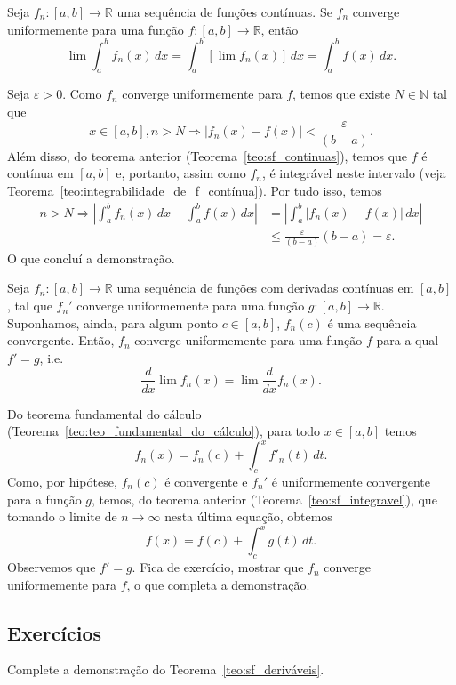 \begin{teo}\label{teo:sf_integravel}
  Seja $f_n:[a, b]\to\mathbb{R}$ uma sequência de funções contínuas. Se $f_n$ converge uniformemente para uma função $f:[a, b]\to\mathbb{R}$, então
  \begin{equation}
    \lim \int_a^b f_n(x)\,dx = \int_a^b [\lim f_n(x)]\,dx = \int_a^b f(x)\,dx.
  \end{equation}
\end{teo}
\begin{dem}
  Seja $\varepsilon>0$. Como $f_n$ converge uniformemente para $f$, temos que existe $N\in\mathbb{N}$ tal que
  \begin{equation}
    x\in [a, b], n>N \Rightarrow |f_n(x) - f(x)| < \frac{\varepsilon}{(b-a)}.
  \end{equation}
Além disso, do teorema anterior (Teorema~\ref{teo:sf_continuas}), temos que $f$ é contínua em $[a, b]$ e, portanto, assim como $f_n$, é integrável neste intervalo (veja Teorema~\ref{teo:integrabilidade_de_f_contínua}). Por tudo isso, temos
\begin{equation}
  \begin{split}
    n>N \Rightarrow \left|\int_a^b f_n(x)\,dx - \int_a^b f(x)\,dx\right| &= \left|\int_a^b |f_n(x) - f(x)|\,dx\right|\\
    &\leq \frac{\varepsilon}{(b-a)}(b-a) = \varepsilon.
  \end{split}
\end{equation}
O que concluí a demonstração.
\end{dem}

\begin{teo}\label{teo:sf_deriváveis}
  Seja $f_n:[a, b]\to\mathbb{R}$ uma sequência de funções com derivadas contínuas em $[a, b]$, tal que $f_n'$ converge uniformemente para uma função $g:[a, b]\to\mathbb{R}$. Suponhamos, ainda, para algum ponto $c\in [a, b]$, $f_n(c)$ é uma sequência convergente. Então, $f_n$ converge uniformemente para uma função $f$ para a qual $f' = g$, i.e.
  \begin{equation}
    \frac{d}{dx}\lim f_n(x) = \lim \frac{d}{dx}f_n(x).
  \end{equation}
\end{teo}
\begin{dem}
  Do teorema fundamental do cálculo (Teorema~\ref{teo:teo_fundamental_do_cálculo}), para todo $x\in [a, b]$ temos
  \begin{equation}\label{eq:sf_tfc1}
    f_n(x) = f_n(c) + \int_c^x f'_n(t)\,dt.
  \end{equation}
Como, por hipótese, $f_n(c)$ é convergente e $f_n'$ é uniformemente convergente para a função $g$, temos, do teorema anterior (Teorema~\ref{teo:sf_integravel}), que tomando o limite de $n\to \infty$ nesta última equação, obtemos
  \begin{equation}\label{eq:sf_tfc2}
    f(x) = f(c) + \int_c^x g(t)\,dt.
  \end{equation}
Observemos que $f' = g$. Fica de exercício, mostrar que $f_n$ converge uniformemente para $f$, o que completa a demonstração.
\end{dem}

\subsection*{Exercícios}

\begin{exer}
  Complete a demonstração do Teorema~\ref{teo:sf_deriváveis}.
\end{exer}